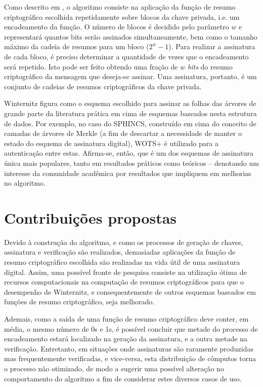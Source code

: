 \documentclass[12pt]{article}
\begin{document}
Como descrito em \cite{Bernstein:2008:PQC:1522375}, o algoritmo consiste na
aplicação da função de resumo criptográfico escolhida repetidamente sobre
blocos da chave privada, i.e. um encadeamento da função. O número de blocos é
decidido pelo parâmetro $w$ e representará quantos bits serão assinados
simultaneamente, bem como o tamanho máximo da cadeia de resumos para um bloco
($2^w - 1$). Para realizar a assinatura de cada bloco, é preciso determinar a
quantidade de vezes que o encadeamento será repetido. Isto pode ser feito
obtendo uma fração de $w$ \emph{bits} do resumo criptográfico da mensagem que
deseja-se assinar. Uma assinatura, portanto, é um conjunto de cadeias de
resumos criptográficos da chave privada.

Winternitz figura como o esquema escolhido para assinar as folhas das árvores
de grande parte da literatura prática em cima de esquemas baseados nesta
estrutura de dados. Por exemplo, no caso do SPHINCS, construído em cima do
conceito de camadas de árvores de Merkle (a fim de descartar a necessidade de
manter o estado do esquema de assinatura digital), WOTS+ é utilizado para a
autenticação entre estas. Afirma-se, então, que é um dos esquemas de assinatura
única mais populares, tanto em resultados práticos como teóricos -- denotando
um interesse da comunidade acadêmica por resultados que impliquem em melhorias
no algoritmo.

\section{Contribuições propostas}

Devido à construção do algoritmo, e como os processos de geração de chaves,
assinatura e verificação são realizados, demasiadas aplicações da função de
resumo criptográfico escolhida são realizadas na vida útil de uma assinatura
digital. Assim, uma possível fronte de pesquisa consiste na utilização ótima de
recursos computacionais na computação de resumos criptográficos para que o
desempenho de Winternitz, e consequentemente de outros esquemas baseados em
funções de resumo criptográfico, seja melhorado.

Ademais, como a saída de uma função de resumo criptográfico deve conter, em
média, o mesmo número de 0s e 1s, é possível concluir que metade do processo de
encadeamento estará localizado na geração da assinatura, e a outra metade na
verificação. Entretanto, em situações onde assinaturas são raramente produzidas
mas frequentemente verificadas, e vice-versa, esta distribuição de cômputos
torna o processo não otimizado, de modo a sugerir uma possível alteração no
comportamento do algoritmo a fim de considerar estes diversos casos de uso.
\end{document}
